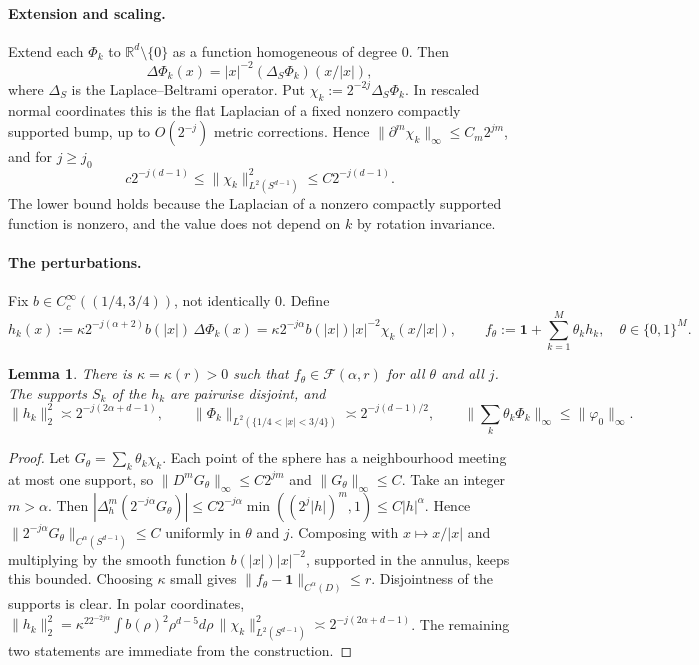 \documentclass[11pt]{article}
\newtheorem{lemma}[theorem]{Lemma}
\theoremstyle{definition}
\theoremstyle{remark}
\newcommand{\R}{\mathbb R}
\newcommand{\one}{\mathbf 1}
\newcommand{\Fc}{\mathcal F}
\begin{document}
\paragraph{Extension and scaling.} Extend each $\Phi_k$ to $\R^d\setminus\{0\}$ as a function homogeneous of degree $0$. Then
\[
\Delta\Phi_k(x)=|x|^{-2}(\Delta_S\Phi_k)(x/|x|),
\]
where $\Delta_S$ is the Laplace--Beltrami operator. Put $\chi_k:=2^{-2j}\Delta_S\Phi_k$. In rescaled normal coordinates this is the flat Laplacian of a fixed nonzero compactly supported bump, up to $O(2^{-j})$ metric corrections. Hence $\|\partial^m\chi_k\|_\infty\le C_m2^{jm}$, and for $j\ge j_0$ 
\[
c2^{-j(d-1)}\le\|\chi_k\|^2_{L^2(S^{d-1})}\le C2^{-j(d-1)} .
\]
The lower bound holds because the Laplacian of a nonzero compactly supported function is nonzero, and the value does not depend on $k$ by rotation invariance.

\paragraph{The perturbations.} Fix $b\in C^\infty_c((1/4,3/4))$, not identically $0$. Define
\[
h_k(x):=\kappa2^{-j(\alpha+2)}b(|x|)\,\Delta\Phi_k(x)=\kappa2^{-j\alpha}b(|x|)|x|^{-2}\chi_k(x/|x|),
\qquad f_\theta:=\one+\sum_{k=1}^M\theta_kh_k,\quad\theta\in\{0,1\}^M .
\]

\begin{lemma}\label{lem:cube}
There is $\kappa=\kappa(r)>0$ such that $f_\theta\in\Fc(\alpha,r)$ for all $\theta$ and all $j$. The supports $S_k$ of the $h_k$ are pairwise disjoint, and
\[
\|h_k\|_2^2\asymp2^{-j(2\alpha+d-1)},\qquad\|\Phi_k\|_{L^2(\{1/4<|x|<3/4\})}\asymp2^{-j(d-1)/2},\qquad\Big\|\sum_k\theta_k\Phi_k\Big\|_\infty\le\|\varphi_0\|_\infty .
\]
\end{lemma}

\begin{proof}
Let $G_\theta=\sum_k\theta_k\chi_k$. Each point of the sphere has a neighbourhood meeting at most one support, so $\|D^mG_\theta\|_\infty\le C2^{jm}$ and $\|G_\theta\|_\infty\le C$. Take an integer $m>\alpha$. Then
$|\Delta^m_h(2^{-j\alpha}G_\theta)|\le C2^{-j\alpha}\min((2^j|h|)^m,1)\le C|h|^\alpha$.
Hence $\|2^{-j\alpha}G_\theta\|_{C^\alpha(S^{d-1})}\le C$ uniformly in $\theta$ and $j$. Composing with $x\mapsto x/|x|$ and multiplying by the smooth function $b(|x|)|x|^{-2}$, supported in the annulus, keeps this bounded. Choosing $\kappa$ small gives $\|f_\theta-\one\|_{C^\alpha(D)}\le r$. Disjointness of the supports is clear. In polar coordinates,
$\|h_k\|^2_2=\kappa^22^{-2j\alpha}\int b(\rho)^2\rho^{d-5}d\rho\,\|\chi_k\|^2_{L^2(S^{d-1})}\asymp2^{-j(2\alpha+d-1)}$.
The remaining two statements are immediate from the construction.
\end{proof}
\end{document}
